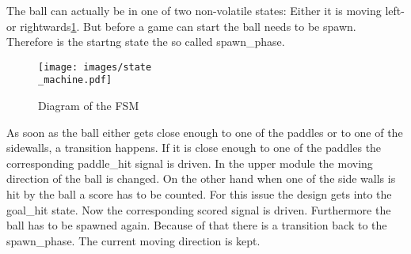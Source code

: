 The ball can actually be in one of two non-volatile states: Either it is moving left- or rightwards\ref{fsm}. But before a game can start the ball needs to be spawn. Therefore is the startng state the so called spawn\_phase.
\begin{figure}[h]
	\texttt{[image: images/state\\\_machine.pdf]}

\caption{Diagram of the FSM}
\label{fsm}
\end{figure}
As soon as the ball either gets close enough to one of the paddles or to one of the sidewalls, a transition happens. If it is close enough to one of the paddles the corresponding paddle\_hit signal is driven. In the upper module the moving direction of the ball is changed. On the other hand when one of the side walls is hit by the ball a score has to be counted. For this issue the design gets into the goal\_hit state. Now the corresponding scored signal is driven. Furthermore the ball has to be spawned again. Because of that there is a transition back to the spawn\_phase. The current moving direction is kept.





